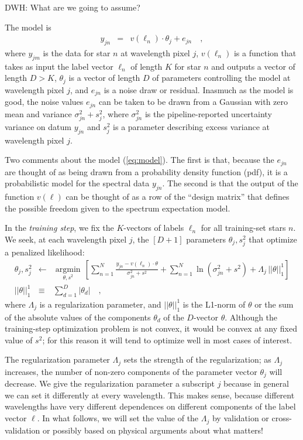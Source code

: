 \documentclass[12pt,preprint]{aastex}
\newcommand{\argmin}[1]{\underset{#1}{\operatorname{argmin}}\,}
\begin{document}
DWH: What are we going to assume?

The model is
\begin{eqnarray}
  y_{jn} &=& v(\ell_n)\cdot\theta_j + e_{jn}
  \label{eq:model}\quad ,
\end{eqnarray}
where $y_{jm}$ is the data for star $n$ at wavelength pixel $j$,
$v(\ell_n)$ is a function that takes as input
the label vector $\ell_n$ of length $K$ for star $n$
and outputs a vector of length $D>K$,
$\theta_j$ is a vector of length $D$ of parameters controlling the model at wavelength pixel $j$,
and $e_{jn}$ is a noise draw or residual.
Inasmuch as the model is good, the noise values $e_{jn}$ can be taken to be
drawn from a Gaussian with zero mean and variance $\sigma^2_{jn}+s^2_j$,
where $\sigma^2_{jn}$ is the pipeline-reported uncertainty variance on datum
$y_{jn}$ and $s^2_j$ is a parameter describing excess variance at wavelength pixel $j$.

Two comments about the model (\ref{eq:model}).
The first is that, because the $e_{jn}$ are thought of as being drawn from a 
probability density function (pdf), it is a probabilistic model for the spectral
data $y_{jn}$.
The second is that the output of the function $v(\ell)$ can be thought
of as a row of the ``design matrix'' that defines the possible freedom
given to the spectrum expectation model.

In the \emph{training step}, we fix the $K$-vectors of labels $\ell_n$
for all training-set stars $n$.
We seek, at each wavelength pixel $j$, the $[D+1]$ parameters
$\theta_j,s^2_j$ that optimize a penalized likelihood:
\begin{eqnarray}
  \theta_j,s^2_j &\leftarrow& \argmin{\theta,s^2}\left[
    \sum_{n=1}^N \frac{y_{jn}-v(\ell_n)\cdot\theta}{\sigma^2_{jn}+s^2}
    + \sum_{n=1}^N \ln(\sigma^2_{jn}+s^2)
    + \Lambda_j\,||\theta||_1^1
    \right]
  \\
  ||\theta||_1^1 &\equiv& \sum_{d=1}^D |\theta_d|
  \quad ,
\end{eqnarray}
where $\Lambda_j$ is a regularization parameter, and $||\theta||_1^1$ is
the L1-norm of $\theta$ or the sum of the absolute values of the
components $\theta_d$ of the $D$-vector $\theta$.
Although the training-step optimization problem is not convex, it
would be convex at any fixed value of $s^2$; for this reason it will
tend to optimize well in most cases of interest.

The regularization parameter $\Lambda_j$ sets the strength of the
regularization; as $\Lambda_j$ increases, the number of non-zero
components of the parameter vector $\theta_j$ will decrease.
We give the regularization parameter a subscript $j$ because in
general we can set it differently at every wavelength.
This makes sense, because different wavelengths have very different
dependences on different components of the label vector $\ell$.
In what follows, we will set the value of the $\Lambda_j$ by
validation or cross-validation or possibly based on physical arguments
about what matters!
\end{document}
